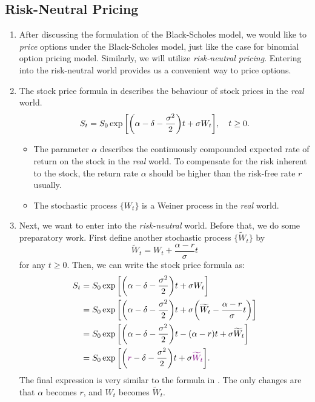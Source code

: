 \subsection{Risk-Neutral Pricing}
\begin{enumerate}
\item After discussing the formulation of the Black-Scholes model, we would
like to \emph{price} options under the Black-Scholes model, just like the case
for binomial option pricing model. Similarly, we will utilize
\emph{risk-neutral pricing}. Entering into the risk-neutral world provides us a
convenient way to price options.

\item The stock price formula in  describes
the behaviour of stock prices in the \emph{real} world.
\[
S_t=S_0\exp\qty[\qty(\alpha-\delta-\frac{\sigma^2}{2})t+\sigma W_t],\quad t\ge 0.
\]
\begin{itemize}
\item The parameter \(\alpha\) describes the continuously compounded expected
rate of return on the stock in the \emph{real} world. To compensate for the
risk inherent to the stock, the return rate \(\alpha\) should be higher than
the risk-free rate \(r\) usually.
\item The stochastic process \(\{W_t\}\) is a Weiner process in the \emph{real}
world.
\end{itemize}
\item Next, we want to enter into the \emph{risk-neutral} world. Before that,
we do some preparatory work. First define another stochastic process
\(\{\widetilde{W}_t\}\) by \[
 \widetilde{W}_t=W_t+\frac{\alpha-r}{\sigma}t
\]
for any \(t\ge 0\). Then, we can write the stock price formula as:
\begin{align*}
S_t&=S_0\exp\qty[\qty(\alpha-\delta-\frac{\sigma^2}{2})t+\sigma W_t] \\
&=S_0\exp\qty[\qty(\alpha-\delta-\frac{\sigma^2}{2})t+\sigma\qty(\widetilde{W}_t-\frac{\alpha-r}{\sigma}t)] \\
&=S_0\exp\qty[\qty(\alpha-\delta-\frac{\sigma^2}{2})t-(\alpha-r)t+\sigma\widetilde{W}_t] \\
&=S_0\exp\qty[\qty({\color{violet}r}-\delta-\frac{\sigma^2}{2})t+\sigma{\color{violet}\widetilde{W}_t}].
\end{align*}
The final expression is very similar to the formula in .
The only changes are that \(\alpha\) becomes \(r\), and \(W_t\) becomes
\(\widetilde{W}_t\).


\end{enumerate}
